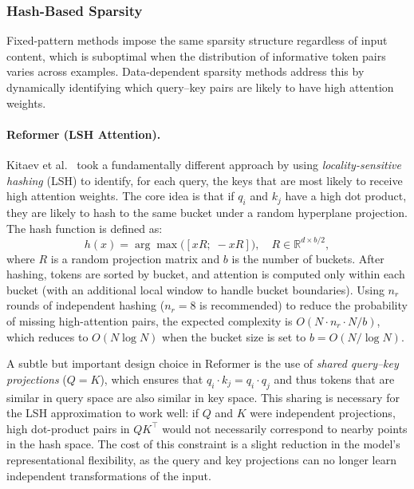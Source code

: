 \subsubsection{Hash-Based Sparsity}
\label{subsubsec:hash-sparsity}

Fixed-pattern methods impose the same sparsity structure regardless of input content, which is suboptimal when the distribution of informative token pairs varies across examples. Data-dependent sparsity methods address this by dynamically identifying which query--key pairs are likely to have high attention weights.

\paragraph{Reformer (LSH Attention).}
Kitaev et al.~\cite{kitaev2020reformer} took a fundamentally different approach by using \emph{locality-sensitive hashing} (LSH) to identify, for each query, the keys that are most likely to receive high attention weights. The core idea is that if $q_i$ and $k_j$ have a high dot product, they are likely to hash to the same bucket under a random hyperplane projection. The hash function is defined as:
\begin{equation}
h(x) = \arg\max\bigl([xR;\; -xR]\bigr), \quad R \in \mathbb{R}^{d \times b/2},
\label{eq:lsh-hash}
\end{equation}
where $R$ is a random projection matrix and $b$ is the number of buckets. After hashing, tokens are sorted by bucket, and attention is computed only within each bucket (with an additional local window to handle bucket boundaries). Using $n_r$ rounds of independent hashing ($n_r = 8$ is recommended) to reduce the probability of missing high-attention pairs, the expected complexity is $O(N \cdot n_r \cdot N/b)$, which reduces to $O(N \log N)$ when the bucket size is set to $b = O(N / \log N)$.

A subtle but important design choice in Reformer is the use of \emph{shared query--key
projections} ($Q = K$), which ensures that $q_i \cdot k_j = q_i \cdot q_j$ and thus
tokens that are similar in query space are also similar in key space.
This sharing is necessary for the LSH approximation to work well: if $Q$ and $K$ were
independent projections, high dot-product pairs in $QK^\top$ would not necessarily
correspond to nearby points in the hash space.
The cost of this constraint is a slight reduction in the model's representational
flexibility, as the query and key projections can no longer learn independent
transformations of the input.

